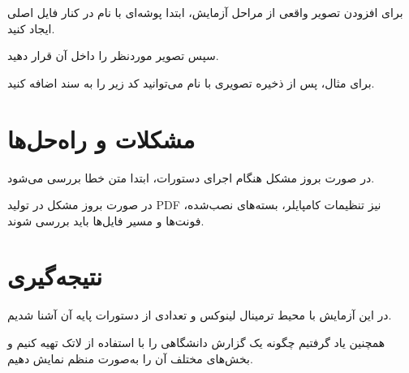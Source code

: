 \documentclass[12pt,a4paper]{article}
\begin{document}
برای افزودن تصویر واقعی از مراحل آزمایش،
ابتدا پوشه‌ای با نام
در کنار فایل اصلی ایجاد کنید.

سپس تصویر موردنظر را داخل آن قرار دهید.

برای مثال، پس از ذخیره تصویری با نام
می‌توانید کد زیر را به سند اضافه کنید.

%

\section{مشکلات و راه‌حل‌ها}

در صورت بروز مشکل هنگام اجرای دستورات،
ابتدا متن خطا بررسی می‌شود.

در صورت بروز مشکل در تولید PDF نیز
تنظیمات کامپایلر، بسته‌های نصب‌شده،
فونت‌ها و مسیر فایل‌ها باید بررسی شوند.

\section{نتیجه‌گیری}

در این آزمایش با محیط ترمینال لینوکس
و تعدادی از دستورات پایه آن آشنا شدیم.

همچنین یاد گرفتیم چگونه یک گزارش دانشگاهی
را با استفاده از لاتک تهیه کنیم و
بخش‌های مختلف آن را به‌صورت منظم نمایش دهیم.
\end{document}
